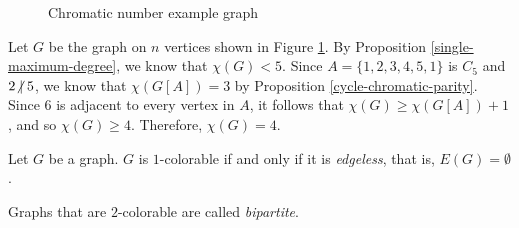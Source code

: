 \begin{figure}[ht!]
    \centering
\caption{Chromatic number example graph}
\label{fig:chromatic-graph-example}
\end{figure}

\begin{exmp}
    Let $G$ be the graph on $n$ vertices shown in Figure \ref{fig:chromatic-graph-example}. By Proposition \ref{single-maximum-degree}, we know that $\chi(G) < 5$. Since $A = \{1, 2, 3, 4, 5, 1\}$ is $C_5$ and $2 \centernot\mid 5$, we know that $\chi(G[A]) = 3$ by Proposition \ref{cycle-chromatic-parity}. Since $6$ is adjacent to every vertex in $A$, it follows that $\chi(G) \geq \chi(G[A]) + 1$, and so $\chi(G) \geq 4$. Therefore, $\chi(G) = 4$.
\end{exmp}

\begin{prop}
    Let $G$ be a graph. $G$ is $1$-colorable if and only if it is \emph{edgeless}, that is, $E(G) = \emptyset$.
\end{prop}

\begin{defn}
    Graphs that are $2$-colorable are called \emph{bipartite}.
\end{defn}

